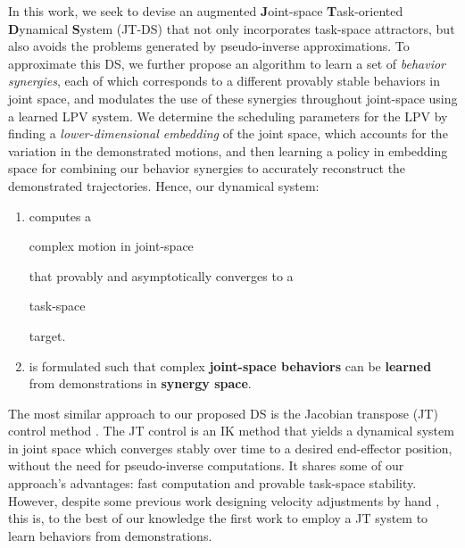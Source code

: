 \documentclass[letterpaper, 10 pt, conference,fleqn]{ieeeconf}
\begin{document}
In this work, we seek to devise an augmented \textbf{J}oint-space \textbf{T}ask-oriented \textbf{D}ynamical \textbf{S}ystem (JT-DS) that not only incorporates task-space attractors, but also avoids the problems generated by pseudo-inverse approximations. To approximate this DS, we further propose an algorithm to learn a set of \emph{behavior synergies}, each of which corresponds to a different provably stable behaviors in joint space, and modulates the use of these synergies throughout joint-space using a learned LPV system. We determine the scheduling parameters for the LPV by finding a \emph{lower-dimensional embedding} of the joint space, which accounts for the variation in the demonstrated motions, and then learning a policy in embedding space for combining our behavior synergies to accurately reconstruct the demonstrated trajectories. %
Hence, our dynamical system:
\begin{enumerate}[leftmargin=*]
\item computes a \begin{bf}complex motion in joint-space\end{bf} that provably and asymptotically converges to a \begin{bf}task-space \end{bf} target.
\item is formulated such that complex \textbf{joint-space behaviors} can be \textbf{learned} from demonstrations in \textbf{synergy space}.
\end{enumerate}


The most similar approach to our proposed DS is the Jacobian transpose (JT) control method \cite{wolovich1984computational} . The JT control is an IK method that yields a dynamical system in joint space %
which converges stably over time to a desired end-effector position, %
 without the need for pseudo-inverse computations. It shares some of our approach's advantages: fast computation and provable task-space stability. However, despite some previous work designing velocity adjustments by hand \cite{Shi2016}, this is, to the best of our knowledge the first work to employ a JT system to learn behaviors from demonstrations. 
\end{document}
